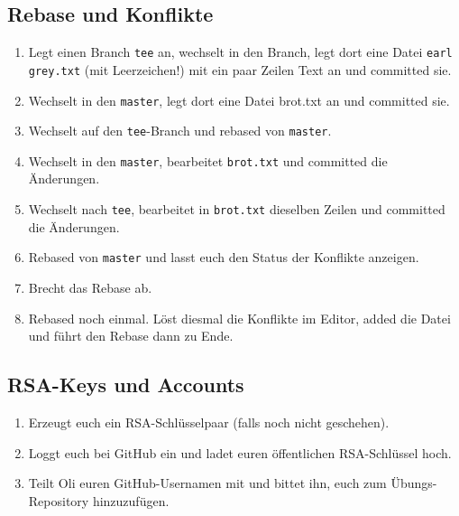 \documentclass[a4paper,12pt]{scrartcl}
\begin{document}
\subsection{Rebase und Konflikte}
\begin{enumerate}
  \item Legt einen Branch \texttt{tee} an, wechselt in den Branch, legt dort eine Datei \texttt{earl grey.txt} (mit Leerzeichen!) mit ein paar Zeilen Text an und committed sie.
  \item Wechselt in den \texttt{master}, legt dort eine Datei {brot.txt} an und committed sie.
  \item Wechselt auf den \texttt{tee}-Branch und rebased von \texttt{master}.
  \item Wechselt in den \texttt{master}, bearbeitet \texttt{brot.txt} und committed die Änderungen.
  \item Wechselt nach \texttt{tee}, bearbeitet in \texttt{brot.txt} dieselben Zeilen und committed die Änderungen.
  \item Rebased von \texttt{master} und lasst euch den Status der Konflikte anzeigen.
  \item Brecht das Rebase ab.
  \item Rebased noch einmal. Löst diesmal die Konflikte im Editor, added die Datei und führt den Rebase dann zu Ende.
\end{enumerate}


\subsection{RSA-Keys und Accounts}
\begin{enumerate}
  \item Erzeugt euch ein RSA-Schlüsselpaar (falls noch nicht geschehen).
  \item Loggt euch bei GitHub ein und ladet euren öffentlichen RSA-Schlüssel hoch.
  \item Teilt Oli euren GitHub-Usernamen mit und bittet ihn, euch zum Übungs-Repository hinzuzufügen.
\end{enumerate}
\end{document}
